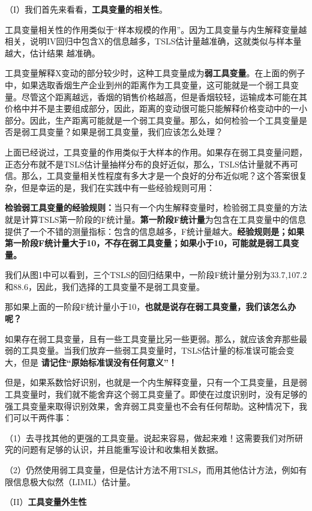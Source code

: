 \documentclass[cn,10pt,math=newtx,citestyle=gb7714-2015,bibstyle=gb7714-2015]{elegantbook}
\begin{document}
	
	
	（I）我们首先来看看，\textbf{工具变量的相关性}。
	
	工具变量相关性的作用类似于“样本规模的作用”。因为工具变量与内生解释变量越相关，说明IV回归中包含X的信息越多，TSLS估计量越准确，这就类似与样本量越大，估计结果 越准确。
	
	工具变量解释X变动的部分较少时，这种工具变量成为\textbf{弱工具变量}。在上面的例子中，如果选取香烟生产企业到州的距离作为工具变量，这可能就是一个弱工具变量。尽管这个距离越远，香烟的销售价格越高，但是香烟较轻，运输成本可能在其价格中并不是主要组成部分，因此，距离的变动很可能只能解释价格变动中的一小部分。因此，生产距离可能就是一个弱工具变量。那么，如何检验一个工具变量是否是弱工具变量？如果是弱工具变量，我们应该怎么处理？
	
	上面已经说过，工具变量的作用类似于大样本的作用。如果存在弱工具变量问题，正态分布就不是TSLS估计量抽样分布的良好近似，那么，TSLS估计量就不再可信。那么，工具变量相关性程度有多大才是一个良好的分布近似呢？这个答案很复杂，但是幸运的是，我们在实践中有一些经验规则可用：
	
	\textbf{检验弱工具变量的经验规则：}当只有一个内生解释变量时，检验弱工具变量的方法就是计算TSLS第一阶段的F统计量。\textbf{第一阶段F统计量}为包含在工具变量中的信息提供了一个不错的测量指标：包含的信息越多，F统计量越大。\textbf{经验规则是；如果第一阶段F统计量大于10，不存在弱工具变量；如果小于10，可能就是弱工具变量。}
	
	我们从图1中可以看到，三个TSLS的回归结果中，一阶段F统计量分别为33.7,107.2和88.6，因此，我们选择的工具变量不是弱工具变量。
	
	那如果上面的一阶段F统计量小于10，\textbf{也就是说存在弱工具变量，我们该怎么办呢？}
	
	如果存在弱工具变量，且有一些工具变量比另一些更弱。那么，就应该舍弃那些最弱的工具变量。当我们放弃一些弱工具变量时，TSLS估计量的标准误可能会变大，但是       \textbf{请记住“原始标准误没有任何意义”！}
	
	但是，如果系数恰好识别，也就是一个内生解释变量，只有一个工具变量，且是弱工具变量时，我们就不能舍弃这个弱工具变量了。即使在过度识别时，没有足够的强工具变量来取得识别效果，舍弃弱工具变量也不会有任何帮助。这种情况下，我们可以干两件事：
	
	（1）去寻找其他的更强的工具变量。说起来容易，做起来难！这需要我们对所研究的问题有足够的认识，并且能重写设计和收集相关数据。
	
	（2）仍然使用弱工具变量，但是估计方法不用TSLS，而用其他估计方法，例如有限信息极大似然（LIML）估计量。
	
	（II）\textbf{工具变量外生性}
	
\end{document}
